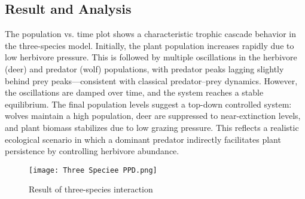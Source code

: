 \documentclass[12pt]{article}
\begin{document}
\subsection{Result and Analysis}
The population vs. time plot shows a characteristic trophic cascade behavior in the three-species model. Initially, the plant population increases rapidly due to low herbivore pressure. This is followed by multiple oscillations in the herbivore (deer) and predator (wolf) populations, with predator peaks lagging slightly behind prey peaks—consistent with classical predator–prey dynamics.
However, the oscillations are damped over time, and the system reaches a stable equilibrium. The final population levels suggest a top-down controlled system: wolves maintain a high population, deer are suppressed to near-extinction levels, and plant biomass stabilizes due to low grazing pressure. This reflects a realistic ecological scenario in which a dominant predator indirectly facilitates plant persistence by controlling herbivore abundance.

\begin{figure}
    \centering
    \texttt{[image: Three Speciee PPD.png]}
    \caption{Result of three-species interaction}
    \label{fig:enter-label}
\end{figure}
\end{document}
